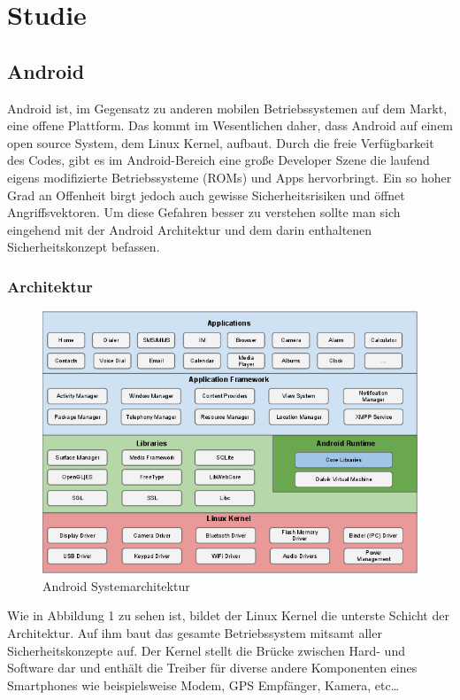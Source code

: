\chapter{Studie}
\section{Android}
Android ist, im Gegensatz zu anderen mobilen Betriebssystemen auf dem Markt, eine offene Plattform. Das kommt im Wesentlichen daher, dass Android auf einem open source System, dem Linux Kernel, aufbaut. Durch die freie Verfügbarkeit des Codes, gibt es im Android-Bereich eine große Developer Szene die laufend eigens modifizierte Betriebssysteme (ROMs) und Apps hervorbringt.
Ein so hoher Grad an Offenheit birgt jedoch auch gewisse Sicherheitsrisiken und öffnet Angriffsvektoren. Um diese Gefahren besser zu verstehen sollte man sich eingehend mit der Android Architektur und dem darin enthaltenen Sicherheitskonzept befassen.

\subsection{Architektur}
\begin{figure}[H]
\includegraphics[scale=0.7]{Images/android_stack}
\caption{Android Systemarchitektur}
\end{figure}
Wie in Abbildung 1 zu sehen ist, bildet der Linux Kernel die unterste Schicht der Architektur. Auf ihm baut das gesamte Betriebssystem mitsamt aller Sicherheitskonzepte auf. Der Kernel stellt die Brücke zwischen Hard- und Software dar und enthält die Treiber für diverse andere Komponenten eines Smartphones wie beispielsweise Modem, GPS Empfänger, Kamera, etc… 
